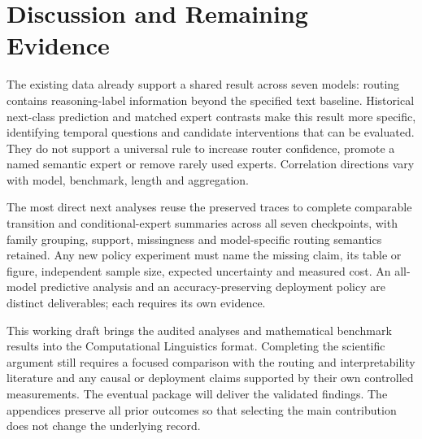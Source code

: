 \section{Discussion and Remaining Evidence}

The existing data already support a shared result across seven models:
routing contains reasoning-label information beyond the specified text
baseline. Historical next-class prediction and matched expert contrasts
make this result more specific, identifying temporal questions and
candidate interventions that can be evaluated. They do not support a
universal rule to increase router confidence, promote a named semantic
expert or remove rarely used experts. Correlation directions vary with
model, benchmark, length and aggregation.

The most direct next analyses reuse the preserved traces to complete
comparable transition and conditional-expert summaries across all seven
checkpoints, with family grouping, support, missingness and model-specific
routing semantics retained. Any new policy experiment must name the
missing claim, its table or figure, independent sample size, expected
uncertainty and measured cost. An all-model predictive analysis and an
accuracy-preserving deployment policy are distinct deliverables; each
requires its own evidence.

This working draft brings the audited analyses and mathematical benchmark
results into the Computational Linguistics format. Completing the
scientific argument still requires a focused comparison with the routing
and interpretability literature and any causal or deployment claims
supported by their own controlled measurements. The eventual package will
deliver the validated findings. The appendices preserve all prior outcomes
so that selecting the main contribution does not change the underlying
record.
